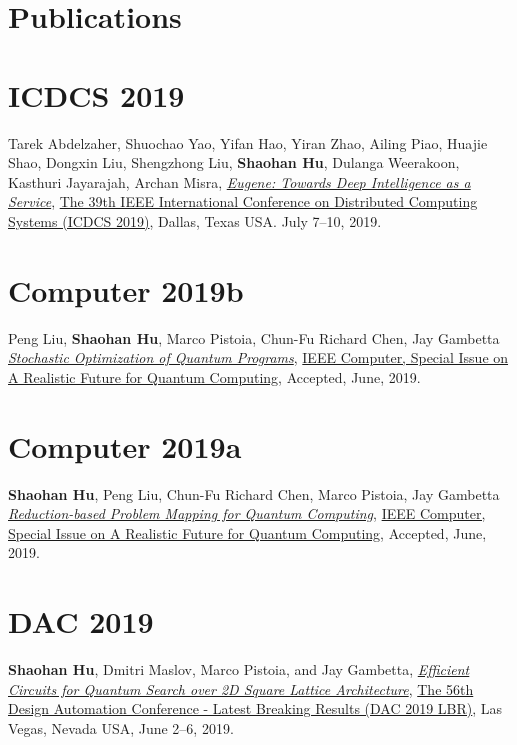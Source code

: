 \section{\sc Publications}

\section{\sc ICDCS 2019}\hypertarget{abdelzaher2019icdcs}{}
Tarek Abdelzaher, Shuochao Yao, Yifan Hao, Yiran Zhao, Ailing Piao, Huajie Shao, Dongxin Liu, Shengzhong Liu, \textbf{Shaohan Hu}, Dulanga Weerakoon, Kasthuri Jayarajah, Archan Misra,
\href{}{\emph{Eugene: Towards Deep Intelligence as a Service}},
\href{https://theory.utdallas.edu/ICDCS2019/}{\textsf{The 39th IEEE International Conference on Distributed Computing Systems (ICDCS 2019)}},
Dallas, Texas USA. July 7--10, 2019.

\section{\sc Computer 2019b}\hypertarget{liu2019computer}{}
Peng Liu, \textbf{Shaohan Hu}, Marco Pistoia, Chun-Fu Richard Chen, Jay Gambetta
\href{}{\emph{Stochastic Optimization of Quantum Programs}},
\href{https://publications.computer.org/computer-magazine/}{\textsf{IEEE Computer, Special Issue on A Realistic Future for Quantum Computing}},
Accepted, June, 2019.

\section{\sc Computer 2019a}\hypertarget{hu2019computer}{}
\textbf{Shaohan Hu}, Peng Liu, Chun-Fu Richard Chen, Marco Pistoia, Jay Gambetta
\href{}{\emph{Reduction-based Problem Mapping for Quantum Computing}},
\href{https://publications.computer.org/computer-magazine/}{\textsf{IEEE Computer, Special Issue on A Realistic Future for Quantum Computing}},
Accepted, June, 2019.

\section{\sc DAC 2019}\hypertarget{hu2019dac}{}
\textbf{Shaohan Hu}, Dmitri Maslov, Marco Pistoia, and Jay Gambetta,
\href{}{\emph{Efficient Circuits for Quantum Search over 2D Square Lattice Architecture}},
\href{https://dac.com/late-breaking-results}{\textsf{The 56th Design Automation Conference - Latest Breaking Results (DAC 2019 LBR)}},
Las Vegas, Nevada USA, June 2--6, 2019.


